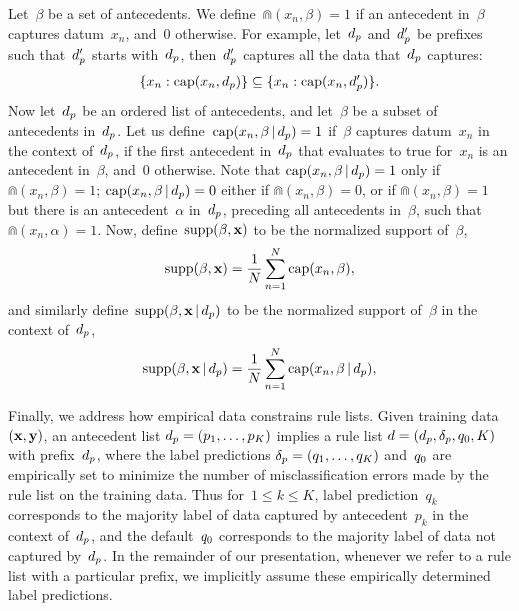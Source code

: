 Let~$\beta$ be a set of antecedents.
%
We define~${\Cap(x_n, \beta) = 1}$ if an antecedent in~$\beta$
captures datum~$x_n$, and~0 otherwise.
%
For example, let~$d_p$ and~$d_p'$ be prefixes such that~$d_p'$ starts
with~$d_p$, then~$d_p'$ captures all the data that~$d_p$ captures:
\begin{align}
\{x_n: \Cap(x_n, \Prefix)\} \subseteq \{x_n: \Cap(x_n, \Prefix')\}.
\label{eq:cap-subset}
\end{align}
%
Now let~$d_p$ be an ordered list of antecedents,
and let~$\beta$ be a subset of antecedents in~$d_p$.
%
Let us define~${\textnormal{cap}(x_n, \beta \,|\, d_p) = 1}$ if~$\beta$
captures datum~$x_n$ in the context of~$d_p$,
\ie if the first antecedent in~$d_p$ that evaluates to true for~$x_n$
is an antecedent in~$\beta$,
and~0 otherwise.
%
Note that ${\textnormal{cap}(x_n, \beta \,|\, d_p) = 1}$ only if ${\Cap(x_n, \beta) = 1}$;
${\textnormal{cap}(x_n, \beta \,|\, d_p) = 0}$ either if ${\Cap(x_n, \beta) = 0}$,
or if ${\Cap(x_n, \beta) = 1}$ but there is an antecedent~$\alpha$ in~$d_p$,
preceding all antecedents in~$\beta$, such that ${\Cap(x_n, \alpha) = 1}$.
%
Now, define~${\textnormal{supp}(\beta, \mathbf{x})}$ to be the normalized support of~$\beta$,
\begin{align}
\Supp(\beta, \x) = \frac{1}{N} \sum_{n=1}^N \Cap(x_n, \beta),
\label{eq:support}
\end{align}
and similarly define~${\textnormal{supp}(\beta, \mathbf{x} \,|\, d_p)}$
to be the normalized support of~$\beta$ in the context of~$d_p$,
\begin{align}
\Supp(\beta, \x \given \Prefix) = \frac{1}{N} \sum_{n=1}^N \Cap(x_n, \beta \given \Prefix),
\label{eq:support-context}
\end{align}

Finally, we address how empirical data constrains rule lists.
%
Given training data~${(\mathbf{x}, \mathbf{y})}$,
an antecedent list ${d_p = (p_1, \dots, p_K)}$
implies a rule list ${{d} = (d_p, \delta_p, q_0, K)}$
with prefix~$d_p$, where the label predictions
${\delta_p = (q_1, \dots, q_K)}$ and~$q_0$ are empirically set
to minimize the number of misclassification errors made by
the rule list on the training data.
%
Thus for~${1 \le k \le K}$, label prediction~$q_k$ corresponds to the
majority label of data captured by antecedent~$p_k$ in the context of~$d_p$,
and the default~$q_0$ corresponds to the majority label of data
not captured by~$d_p$.
%
In the remainder of our presentation, whenever we refer to a rule list with a
particular prefix, we implicitly assume these empirically determined label predictions.

